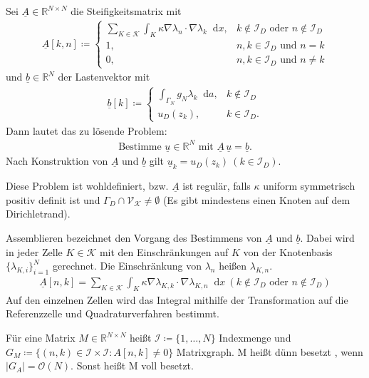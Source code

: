 \documentclass[12pt,a4paper]{scrartcl}
\newcommand{\R}{\mathbb{R}}
\newcommand*\diff{\mathop{}\!\mathrm{d}}
\newcommand{\defi}[1]{\textcolor{Mygreen}{#1}}
\numberwithin{equation}{section}
\begin{document}
\begin{enumerate}[label=(\roman*)]
	Sei $\underline{A} \in \R^{N \times N} $ die \defi{Steifigkeitsmatrix} mit 
	\begin{align*}		
		\underline{A}[k,n] \coloneqq
		\begin{cases}
			\sum_{K \in \mathcal{K}} \int_K \kappa \nabla \lambda_n \cdot \nabla \lambda_k \diff x, & k \notin \mathcal{I}_D \text{ oder } n \notin \mathcal{I}_D \\
			1, & n,k \in \mathcal{I}_D \text{ und } n = k\\
			0, & n,k \in \mathcal{I}_D \text{ und } n \neq k 
		\end{cases}
	\end{align*}
	und $\underline{b} \in \R^N $ der \defi{Lastenvektor} mit
	\begin{align*}
		\underline{b}[k] \coloneqq
		\begin{cases}
			\int_{\Gamma_N} g_N \lambda_k \diff a, & k \notin \mathcal{I}_D \\
			u_D(z_k), & k \in \mathcal{I}_D.
		\end{cases}
	\end{align*}
	Dann lautet das zu lösende Problem:
	\begin{align*}
			\text{Bestimme } \underline{u} \in \R^N \text{ mit } \underline{A}\, \underline{u} = \underline{b}.			
	\end{align*}
	Nach Konstruktion von $\underline{A}$ und $ \underline{b} $ gilt $\underline{u}_k = u_D(z_k) \ (k\in \mathcal{I}_D)$.
	
	Diese Problem ist wohldefiniert, bzw. $ \underline{A} $ ist regulär, falls $ \kappa $ uniform symmetrisch positiv definit ist und $ \Gamma_D \cap \mathcal{V}_\mathcal{K} \neq \emptyset$ (Es gibt mindestens einen Knoten auf dem Dirichletrand).
	
	\defi{Assemblieren} bezeichnet den Vorgang des Bestimmens von $ \underline{A} $ und $ \underline{b}$. Dabei wird in jeder Zelle $ K \in \mathcal{K} $ mit den Einschränkungen auf $ K $ von der Knotenbasis $ \{ \lambda_{K,i} \}_{i=1}^N $ gerechnet. Die Einschränkung von $ \lambda_n $ heißen $ \lambda_{K,n} $.
	\begin{align*}
		\underline{A}[n,k] = \sum_{K \in \mathcal{K}} \int_{K} \kappa \nabla \lambda_{K,k} \cdot \nabla \lambda_{K,n} \diff x \ (k \notin \mathcal{I}_D \text{ oder } n \notin \mathcal{I}_D)
	\end{align*}
	Auf den einzelnen Zellen wird das Integral mithilfe der Transformation auf die Referenzzelle und Quadraturverfahren bestimmt.
	
		
	Für eine Matrix $ M \in \R^{N \times N} $ heißt $ \mathcal{I} \coloneqq \{1 , \dots , N\} $ \defi{Indexmenge} und
	$ G_M \coloneqq  \{(n,k) \in \mathcal{I} \times \mathcal{I} : A[n,k] \neq 0 \} $ \defi{Matrixgraph}. M heißt \defi{dünn besetzt} , wenn $ |G_A| = \mathcal{O}(N) $. Sonst heißt M \defi{voll besetzt}.
	

\end{enumerate}
\end{document}
